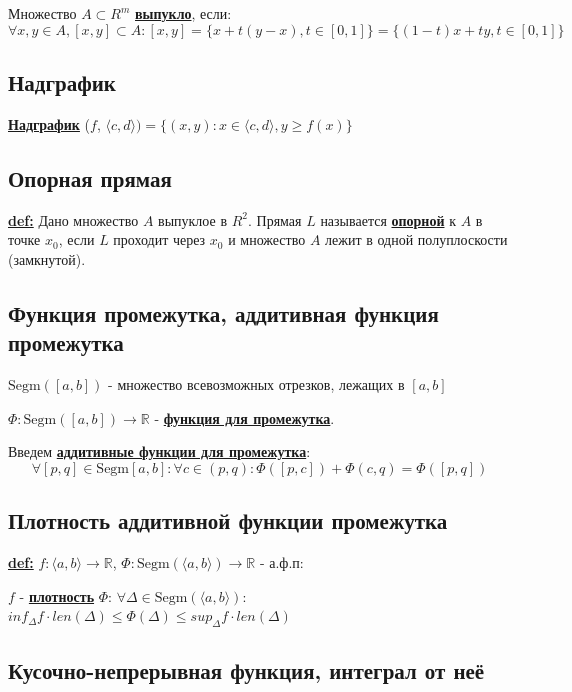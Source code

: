 \documentclass{article}
\newcommand{\Segm}{\text{Segm}}
\newcommand{\deff}[1]{\underline{\textbf{#1}}}
\begin{document}
Множество $A \subset R^m$ \deff{выпукло}, если:
$$\forall x,y \in A , [x,y]\subset A: [x,y] = \{x+t(y-x), t\in[0,1]\} = \{(1-t)x + ty, t\in[0,1]\}$$

\subsection{Надграфик}

\deff{Надграфик} ($f$, $\langle c,d \rangle) = \{(x,y): x\in \langle c,d \rangle, y \geq f(x)  \}$

\subsection{Опорная прямая}

\deff{def:} Дано множество $A$ выпуклое в $R^2$. Прямая $L$ называется \deff{опорной} к $A$ в точке $x_0$, если $L$ проходит через $x_0$ и множество $A$ лежит в одной полуплоскости (замкнутой).

\subsection{Функция промежутка, аддитивная функция промежутка}

$\Segm ([a,b])$ - множество всевозможных отрезков, лежащих в $[a,b]$

$\varPhi: \Segm([a,b]) \rightarrow \mathbb{R}$ - \deff{функция для промежутка}.

Введем \deff{аддитивные функции для промежутка}:
$$\forall [p,q] \in \Segm[a,b]: \forall c \in (p,q): \varPhi([p,c]) + \varPhi(c,q)= \varPhi([p,q])$$




\subsection{Плотность аддитивной функции промежутка}

\deff{def:} $f: \langle a,b \rangle \rightarrow \mathbb{R}$, $\varPhi: \Segm(\langle a,b \rangle) \rightarrow \mathbb{R}$ - а.ф.п:

$f$ - \deff{плотность} $\varPhi$: $\forall \Delta \in \Segm (\langle a,b\rangle):$$inf_{\Delta} f \cdot len(\Delta)\leq \varPhi(\Delta)\leq sup_{\Delta} f \cdot len(\Delta)$

\subsection{Кусочно-непрерывная функция, интеграл от неё}
\end{document}
